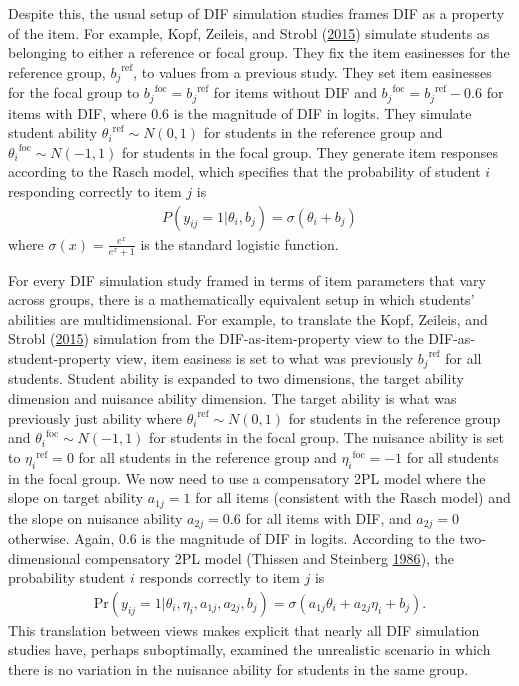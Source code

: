 \documentclass[
  11pt,
]{article}
\begin{document}
Despite this, the usual setup of DIF simulation studies frames DIF as a property of the item. For example, Kopf, Zeileis, and Strobl (\protect\hyperlink{ref-kopf2015framework}{2015}) simulate students as belonging to either a reference or focal group. They fix the item easinesses for the reference group, \({b_j}^{\text{ref}}\), to values from a previous study. They set item easinesses for the focal group to \({b_j}^{\text{foc}} = {b_j}^{\text{ref}}\) for items without DIF and \({b_j}^{\text{foc}} = {b_j}^{\text{ref}} - 0.6\) for items with DIF, where 0.6 is the magnitude of DIF in logits. They simulate student ability \({\theta_i}^{\text{ref}} \sim N(0,1)\) for students in the reference group and \({\theta_i}^{\text{foc}} \sim N(-1,1)\) for students in the focal group. They generate item responses according to the Rasch model, which specifies that the probability of student \(i\) responding correctly to item \(j\) is
\begin{align}
P(y_{ij} = 1 | \theta_i, b_j) = \sigma(\theta_i + b_j)
\end{align}
where \(\sigma(x) = \frac{e^x}{e^x + 1}\) is the standard logistic function.

For every DIF simulation study framed in terms of item parameters that vary across groups, there is a mathematically equivalent setup in which students' abilities are multidimensional. For example, to translate the Kopf, Zeileis, and Strobl (\protect\hyperlink{ref-kopf2015framework}{2015}) simulation from the DIF-as-item-property view to the DIF-as-student-property view, item easiness is set to what was previously \({b_j}^{\text{ref}}\) for all students. Student ability is expanded to two dimensions, the target ability dimension and nuisance ability dimension. The target ability is what was previously just ability where \({\theta_i}^{\text{ref}} \sim N(0,1)\) for students in the reference group and \({\theta_i}^{\text{foc}} \sim N(-1,1)\) for students in the focal group. The nuisance ability is set to \({\eta_i}^{\text{ref}} = 0\) for all students in the reference group and \({\eta_i}^{\text{foc}} = -1\) for all students in the focal group. We now need to use a compensatory 2PL model where the slope on target ability \(a_{1j} = 1\) for all items (consistent with the Rasch model) and the slope on nuisance ability \(a_{2j} = 0.6\) for all items with DIF, and \(a_{2j} = 0\) otherwise. Again, 0.6 is the magnitude of DIF in logits. According to the two-dimensional compensatory 2PL model (Thissen and Steinberg \protect\hyperlink{ref-thissen1986taxonomy}{1986}), the probability student \(i\) responds correctly to item \(j\) is
\begin{align}
\text{Pr}(y_{ij} = 1 | \theta_i, \eta_i, a_{1j}, a_{2j}, b_j) = \sigma(a_{1j}\theta_i + a_{2j}\eta_i + b_j).
\end{align}
This translation between views makes explicit that nearly all DIF simulation studies have, perhaps suboptimally, examined the unrealistic scenario in which there is no variation in the nuisance ability for students in the same group.
\end{document}
